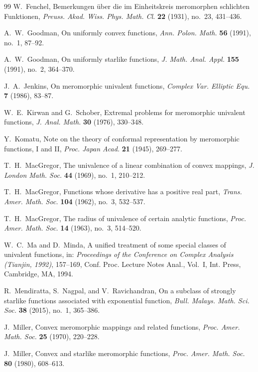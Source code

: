 \documentclass[12pt]{article}
\begin{document}
\begin{thebibliography}{99}
W.~Fenchel,
Bemerkungen \"uber die im Einheitskreis meromorphen schlichten Funktionen,
\emph{Preuss. Akad. Wiss. Phys. Math. Cl.}
\textbf{22} (1931), no.~23, 431--436.

A.~W.~Goodman,
On uniformly convex functions,
\emph{Ann. Polon. Math.}
\textbf{56} (1991), no.~1, 87--92.

A.~W.~Goodman,
On uniformly starlike functions,
\emph{J. Math. Anal. Appl.}
\textbf{155} (1991), no.~2, 364--370.

J.~A.~Jenkins,
On meromorphic univalent functions,
\emph{Complex Var. Elliptic Equ.}
\textbf{7} (1986), 83--87.

W.~E.~Kirwan and G.~Schober,
Extremal problems for meromorphic univalent functions,
\emph{J. Anal. Math.}
\textbf{30} (1976), 330--348.

Y.~Komatu,
Note on the theory of conformal representation by meromorphic functions, I and II,
\emph{Proc. Japan Acad.}
\textbf{21} (1945), 269--277.

T.~H.~MacGregor,
The univalence of a linear combination of convex mappings,
\emph{J. London Math. Soc.}
\textbf{44} (1969), no.~1, 210--212.

T.~H.~MacGregor,
Functions whose derivative has a positive real part,
\emph{Trans. Amer. Math. Soc.}
\textbf{104} (1962), no.~3, 532--537.

T.~H.~MacGregor,
The radius of univalence of certain analytic functions,
\emph{Proc. Amer. Math. Soc.}
\textbf{14} (1963), no.~3, 514--520.

W.~C.~Ma and D.~Minda,
A unified treatment of some special classes of univalent functions,
in: \emph{Proceedings of the Conference on Complex Analysis (Tianjin, 1992)},
157--169, Conf. Proc. Lecture Notes Anal., Vol.~I,
Int. Press, Cambridge, MA, 1994.

R.~Mendiratta, S.~Nagpal, and V.~Ravichandran,
On a subclass of strongly starlike functions associated with exponential function,
\emph{Bull. Malays. Math. Sci. Soc.}
\textbf{38} (2015), no.~1, 365--386.

J.~Miller,
Convex meromorphic mappings and related functions,
\emph{Proc. Amer. Math. Soc.}
\textbf{25} (1970), 220--228.

J.~Miller,
Convex and starlike meromorphic functions,
\emph{Proc. Amer. Math. Soc.}
\textbf{80} (1980), 608--613.


\end{thebibliography}
\end{document}
